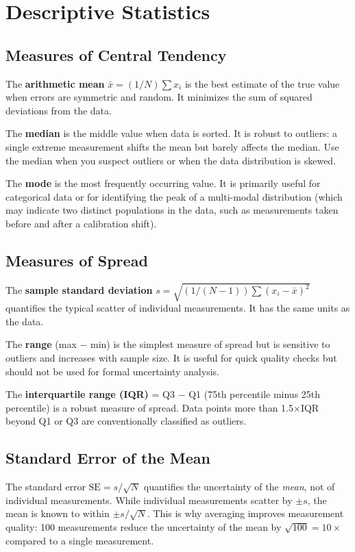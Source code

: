 \documentclass[11pt,letterpaper,twoside,openany]{book}
\begin{document}
\section{Descriptive Statistics}
\subsection{Measures of Central Tendency}
The \textbf{arithmetic mean} $\bar{x} = (1/N)\sum x_i$ is the best estimate of the true value when errors are symmetric and random. It minimizes the sum of squared deviations from the data.

The \textbf{median} is the middle value when data is sorted. It is robust to outliers: a single extreme measurement shifts the mean but barely affects the median. Use the median when you suspect outliers or when the data distribution is skewed.

The \textbf{mode} is the most frequently occurring value. It is primarily useful for categorical data or for identifying the peak of a multi-modal distribution (which may indicate two distinct populations in the data, such as measurements taken before and after a calibration shift).

\subsection{Measures of Spread}
The \textbf{sample standard deviation} $s = \sqrt{(1/(N-1))\sum(x_i - \bar{x})^2}$ quantifies the typical scatter of individual measurements. It has the same units as the data.

The \textbf{range} (max $-$ min) is the simplest measure of spread but is sensitive to outliers and increases with sample size. It is useful for quick quality checks but should not be used for formal uncertainty analysis.

The \textbf{interquartile range (IQR)} = Q3 $-$ Q1 (75th percentile minus 25th percentile) is a robust measure of spread. Data points more than 1.5$\times$IQR beyond Q1 or Q3 are conventionally classified as outliers.

\subsection{Standard Error of the Mean}
The standard error $\text{SE} = s/\sqrt{N}$ quantifies the uncertainty of the \emph{mean}, not of individual measurements. While individual measurements scatter by $\pm s$, the mean is known to within $\pm s/\sqrt{N}$. This is why averaging improves measurement quality: 100 measurements reduce the uncertainty of the mean by $\sqrt{100} = 10\times$ compared to a single measurement.
\end{document}
